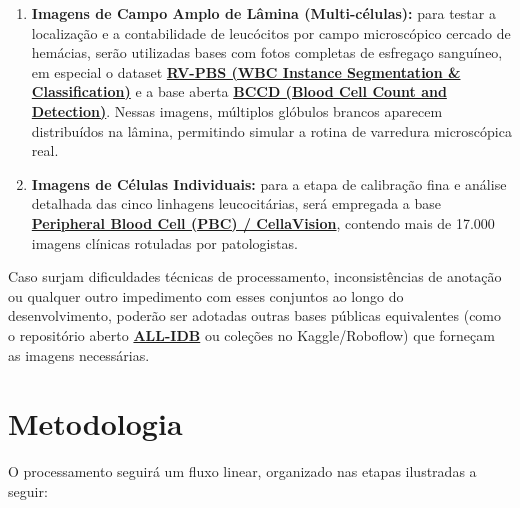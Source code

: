 \documentclass[12pt, a4paper]{article}
\begin{document}
\begin{enumerate}
    \item \textbf{Imagens de Campo Amplo de L\^{a}mina (Multi-c\'{e}lulas):} para testar a localiza\c{c}\~{a}o e a contabilidade de leuc\'{o}citos por campo microsc\'{o}pico cercado de hem\'{a}cias, ser\~{a}o utilizadas bases com fotos completas de esfrega\c{c}o sangu\'{i}neo, em especial o dataset \href{https://www.kaggle.com/datasets/impal20/rvpbs-dataset}{\textbf{RV-PBS (WBC Instance Segmentation \& Classification)}} e a base aberta \href{https://github.com/Shenggan/BCCD_Dataset}{\textbf{BCCD (Blood Cell Count and Detection)}}. Nessas imagens, m\'{u}ltiplos gl\'{o}bulos brancos aparecem distribu\'{i}dos na l\^{a}mina, permitindo simular a rotina de varredura microsc\'{o}pica real.
    \item \textbf{Imagens de C\'{e}lulas Individuais:} para a etapa de calibra\c{c}\~{a}o fina e an\'{a}lise detalhada das cinco linhagens leucocit\'{a}rias, ser\'{a} empregada a base \href{https://www.kaggle.com/datasets/paultimothymooney/blood-cells}{\textbf{Peripheral Blood Cell (PBC) / CellaVision}}, contendo mais de 17.000 imagens cl\'{i}nicas rotuladas por patologistas.
\end{enumerate}

Caso surjam dificuldades t\'{e}cnicas de processamento, inconsist\^{e}ncias de anota\c{c}\~{a}o ou qualquer outro impedimento com esses conjuntos ao longo do desenvolvimento, poder\~{a}o ser adotadas outras bases p\'{u}blicas equivalentes (como o reposit\'{o}rio aberto \href{https://homes.di.unimi.it/scotti/all/}{\textbf{ALL-IDB}} ou cole\c{c}\~{o}es no Kaggle/Roboflow) que forne\c{c}am as imagens necess\'{a}rias.

\section{Metodologia}

O processamento seguir\'{a} um fluxo linear, organizado nas etapas ilustradas a seguir:
\end{document}
